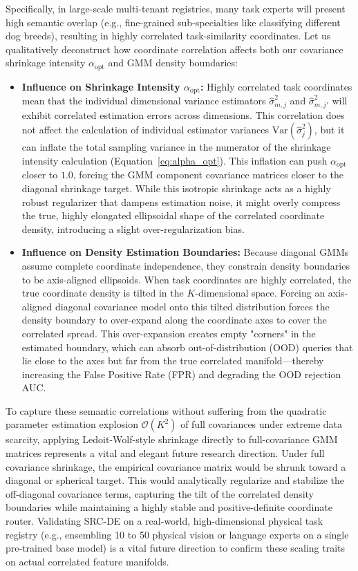 Specifically, in large-scale multi-tenant registries, many task experts will present high semantic overlap (e.g., fine-grained sub-specialties like classifying different dog breeds), resulting in highly correlated task-similarity coordinates. Let us qualitatively deconstruct how coordinate correlation affects both our covariance shrinkage intensity $\alpha_{\text{opt}}$ and GMM density boundaries:
\begin{itemize}
    \item {\bf Influence on Shrinkage Intensity $\alpha_{\text{opt}}$:} Highly correlated task coordinates mean that the individual dimensional variance estimators $\hat{\sigma}^2_{m, j}$ and $\hat{\sigma}^2_{m, j'}$ will exhibit correlated estimation errors across dimensions. This correlation does not affect the calculation of individual estimator variances $\text{Var}(\hat{\sigma}^2_j)$, but it can inflate the total sampling variance in the numerator of the shrinkage intensity calculation (Equation~\ref{eq:alpha_opt}). This inflation can push $\alpha_{\text{opt}}$ closer to $1.0$, forcing the GMM component covariance matrices closer to the diagonal shrinkage target. While this isotropic shrinkage acts as a highly robust regularizer that dampens estimation noise, it might overly compress the true, highly elongated ellipsoidal shape of the correlated coordinate density, introducing a slight over-regularization bias.
    \item {\bf Influence on Density Estimation Boundaries:} Because diagonal GMMs assume complete coordinate independence, they constrain density boundaries to be axis-aligned ellipsoids. When task coordinates are highly correlated, the true coordinate density is tilted in the $K$-dimensional space. Forcing an axis-aligned diagonal covariance model onto this tilted distribution forces the density boundary to over-expand along the coordinate axes to cover the correlated spread. This over-expansion creates empty "corners" in the estimated boundary, which can absorb out-of-distribution (OOD) queries that lie close to the axes but far from the true correlated manifold---thereby increasing the False Positive Rate (FPR) and degrading the OOD rejection AUC.
\end{itemize}
To capture these semantic correlations without suffering from the quadratic parameter estimation explosion $\mathcal{O}(K^2)$ of full covariances under extreme data scarcity, applying Ledoit-Wolf-style shrinkage directly to full-covariance GMM matrices represents a vital and elegant future research direction. Under full covariance shrinkage, the empirical covariance matrix would be shrunk toward a diagonal or spherical target. This would analytically regularize and stabilize the off-diagonal covariance terms, capturing the tilt of the correlated density boundaries while maintaining a highly stable and positive-definite coordinate router. Validating SRC-DE on a real-world, high-dimensional physical task registry (e.g., ensembling 10 to 50 physical vision or language experts on a single pre-trained base model) is a vital future direction to confirm these scaling traits on actual correlated feature manifolds.


